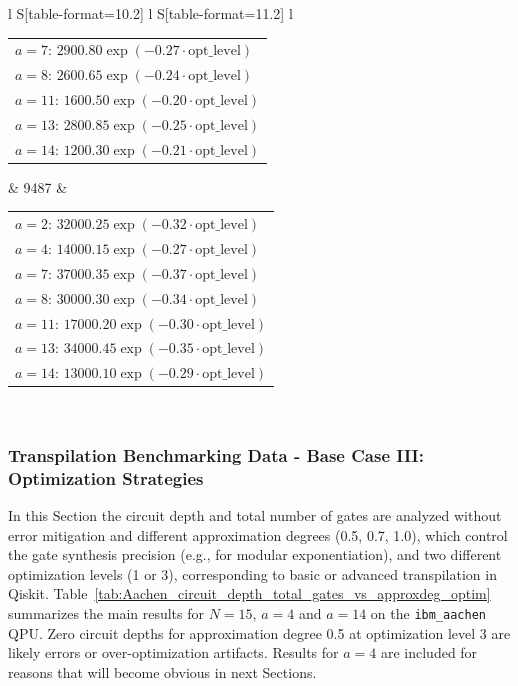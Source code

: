 \documentclass[conference,twoside]{IEEEtran}
\begin{document}
\begin{table}
\begin{tabular}{l S[table-format=10.2] l S[table-format=11.2] l}
\begin{tabular}[t]{@{}l@{}}
            $a=7$: $2900.80 \exp(-0.27 \cdot \text{opt\_level})$ \\
            $a=8$: $2600.65 \exp(-0.24 \cdot \text{opt\_level})$ \\
            $a=11$: $1600.50 \exp(-0.20 \cdot \text{opt\_level})$ \\
            $a=13$: $2800.85 \exp(-0.25 \cdot \text{opt\_level})$ \\
            $a=14$: $1200.30 \exp(-0.21 \cdot \text{opt\_level})$
        \end{tabular} & 9487 & 
        \begin{tabular}[t]{@{}l@{}}
            $a=2$: $32000.25 \exp(-0.32 \cdot \text{opt\_level})$ \\
            $a=4$: $14000.15 \exp(-0.27 \cdot \text{opt\_level})$ \\
            $a=7$: $37000.35 \exp(-0.37 \cdot \text{opt\_level})$ \\
            $a=8$: $30000.30 \exp(-0.34 \cdot \text{opt\_level})$ \\
            $a=11$: $17000.20 \exp(-0.30 \cdot \text{opt\_level})$ \\
            $a=13$: $34000.45 \exp(-0.35 \cdot \text{opt\_level})$ \\
            $a=14$: $13000.10 \exp(-0.29 \cdot \text{opt\_level})$
        \end{tabular} \\
        \bottomrule
    \end{tabular}
\end{table}


\subsubsection{Transpilation Benchmarking Data - Base Case III: Optimization Strategies}

In this Section the circuit depth and total number of gates are analyzed without error mitigation and different approximation degrees (0.5, 0.7, 1.0), which control the gate synthesis precision (e.g., for modular exponentiation), and two different optimization levels (1 or 3), corresponding to basic or advanced transpilation in Qiskit. Table~\ref{tab:Aachen_circuit_depth_total_gates_vs_approxdeg_optim} summarizes the main results for $N=15$, $a=4$ and $a=14$ on the \texttt{ibm\_aachen} QPU. Zero circuit depths for approximation degree 0.5 at optimization level 3 are likely errors or over-optimization artifacts. Results for $a=4$ are included for reasons that will become obvious in next Sections.
\end{document}
